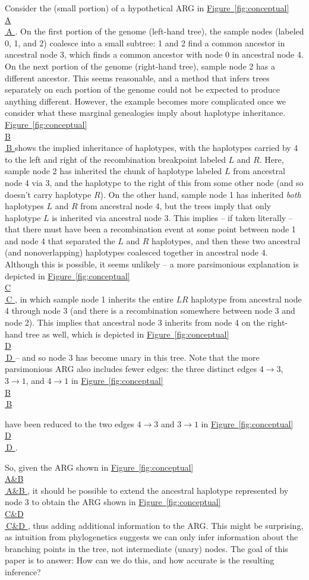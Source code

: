 \documentclass[10pt,twoside,lineno]{gsajnl}
\newcommand*{\figref}[2][]{%
	\hyperref[{#2}]{%
		Figure~\ref*{#2}%
		\ifx\\#1\\%
		\else
		\,#1%
		\fi
	}%
}
\begin{document}

Consider the (small portion) of a hypothetical ARG in \figref[A]{fig:conceptual}.
On the first portion of the genome (left-hand tree), the sample nodes (labeled 0, 1, and 2)
coalesce into a small subtree: 1 and 2 find a common ancestor in ancestral node 3,
which finds a common ancestor with node 0 in ancestral node 4.
On the next portion of the genome (right-hand tree), sample node 2 has a different ancestor.
This seems reasonable, and a method that infers trees separately on each portion of the genome
could not be expected to produce anything different.
However, the example becomes more complicated once we consider what these marginal genealogies imply about haplotype inheritance.
\figref[B]{fig:conceptual} shows the implied inheritance of haplotypes,
with the haplotypes carried by 4 to the left and right of the recombination breakpoint labeled $L$ and $R$.
Here, sample node 2 has inherited the chunk of haplotype labeled $L$ from ancestral node 4 via 3,
and the haplotype to the right of this from some other node (and so doesn't carry haplotype $R$).
On the other hand, sample node 1 has inherited \emph{both} haplotypes $L$ and $R$
from ancestral node 4, but the trees imply that only haplotype $L$ is inherited via ancestral node 3.
This implies -- if taken literally -- that there must have been a recombination event
at some point between node 1 and node 4 that separated the $L$ and $R$ haplotypes,
and then these two ancestral (and nonoverlapping) haplotypes coalesced together in ancestral node 4.
Although this is possible, it seems unlikely --
a more parsimonious explanation is depicted in \figref[C]{fig:conceptual},
in which sample node 1 inherits the entire $LR$ haplotype from ancestral node 4 through node 3
(and there is a recombination somewhere between node 3 and node 2).
This implies that ancestral node 3 inherits from node 4 on the right-hand tree as well,
which is depicted in \figref[D]{fig:conceptual} --
and so node 3 has become unary in this tree.
Note that the more parsimonious ARG also includes fewer edges:
the three distinct edges $4 \to 3$, $3 \to 1$, and $4 \to 1$ in \figref[B]{fig:conceptual}
have been reduced to the two edges
$4 \to 3$ and $3 \to 1$ in \figref[D]{fig:conceptual}.

So, given the ARG shown in \figref[A\&B]{fig:conceptual},
it should be possible to extend the ancestral haplotype represented by node 3
to obtain the ARG shown in \figref[C\&D]{fig:conceptual},
thus adding additional information to the ARG.
This might be surprising,
as intuition from phylogenetics suggests we can only infer
information about the branching points in the tree, not intermediate (unary) nodes.
The goal of this paper is to answer:
How can we do this, and how accurate is the resulting inference?
\end{document}
